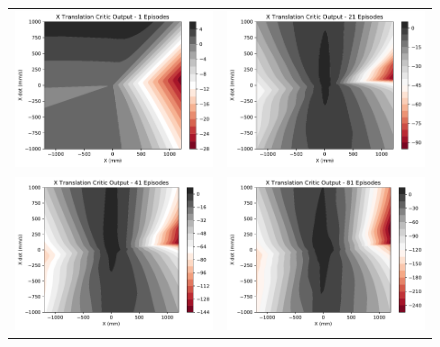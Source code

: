\begin{figure}[H]
	\begin{tabular}{cc}
		\includegraphics[width=65mm]{figures/train_figs/transx_critic/Critic1_1.pdf} &  
		\includegraphics[width=65mm]{figures/train_figs/transx_critic/Critic1_21.pdf} \\
		\includegraphics[width=65mm]{figures/train_figs/transx_critic/Critic1_41.pdf} &   \includegraphics[width=65mm]{figures/train_figs/transx_critic/Critic1_81.pdf} \\

\end{tabular}
\end{figure}

